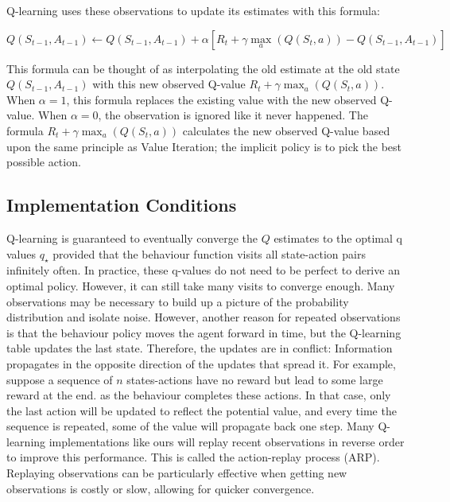 \documentclass[]{final_report}
\begin{document}
Q-learning uses these observations to update its estimates with this formula:

\begin{equation}
  Q(S_{t-1}, A_{t-1}) \leftarrow Q(S_{t-1}, A_{t-1}) +  \alpha [R_t + \gamma \max_a(Q(S_t,a)) - Q(S_{t-1}, A_{t-1})]
  \label{eqn:q-learning-update-formula}
\end{equation}


This formula can be thought of as interpolating the old estimate at the old state $Q(S_{t-1}, A_{t-1})$ with this new observed Q-value $R_t + \gamma \max_a(Q(S_t, a))$. When $\alpha = 1$, this formula replaces the existing value with the new observed Q-value.  When $\alpha = 0$, the observation is ignored like it never happened. The formula $R_t + \gamma \max_a(Q(S_t, a))$ calculates the new observed Q-value based upon the same principle as Value Iteration; the implicit policy is to pick the best possible action. 

\subsection{Implementation Conditions}\label{section:impl-conditions}

Q-learning is guaranteed to eventually converge the $Q$ estimates to the optimal q values $q_\star$ provided that the behaviour function visits all state-action pairs infinitely often. In practice, these q-values do not need to be perfect to derive an optimal policy. However, it can still take many visits to converge enough. Many observations may be necessary to build up a picture of the probability distribution and isolate noise. However, another reason for repeated observations is that the behaviour policy moves the agent forward in time, but the Q-learning table updates the last state. Therefore, the updates are in conflict: Information propagates in the opposite direction of the updates that spread it. For example, suppose a sequence of $n$ states-actions have no reward but lead to some large reward at the end. as the behaviour completes these actions. In that case, only the last action will be updated to reflect the potential value, and every time the sequence is repeated, some of the value will propagate back one step. Many Q-learning implementations like ours will replay recent observations in reverse order to improve this performance. This is called the action-replay process (ARP). Replaying observations can be particularly effective when getting new observations is costly or slow, allowing for quicker convergence.
\end{document}
